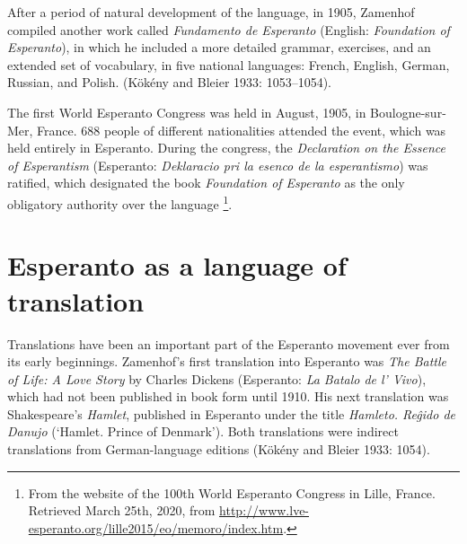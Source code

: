 After a period of natural development of the language, in 1905, Zamenhof compiled another work called \textit{Fundamento de Esperanto} (English: \textit{Foundation of Esperanto}), in which he included a more detailed grammar, exercises, and an extended set of vocabulary, in five national languages: French, English, German, Russian, and Polish.
(Kökény and Bleier 1933: 1053--1054).

The first World Esperanto Congress was held in August, 1905, in Boulogne-sur-Mer, France.
688 people of different nationalities attended the event, which was held entirely in Esperanto.
During the congress, the \textit{Declaration on the Essence of Esperantism} (Esperanto: \textit{Deklaracio pri la esenco de la esperantismo}) was ratified, which designated the book \textit{Foundation of Esperanto} as the only obligatory authority over the language%
\footnote{From the website of the 100th World Esperanto Congress in Lille, France. Retrieved March 25th, 2020, from \url{http://www.lve-esperanto.org/lille2015/eo/memoro/index.htm}.}.

\section{Esperanto as a language of translation} \label{esperanto_translations}
Translations have been an important part of the Esperanto movement ever from its early beginnings.
Zamenhof's first translation into Esperanto was \textit{The Battle of Life: A Love Story} by Charles Dickens (Esperanto: \textit{La Batalo de l' Vivo}), which had not been published in book form until 1910.
His next translation was Shakespeare's \textit{Hamlet}, published in Esperanto under the title \textit{Hamleto. Reĝido de Danujo} (`Hamlet. Prince of Denmark').
Both translations were indirect translations from German-language editions
(Kökény and Bleier 1933: 1054).

